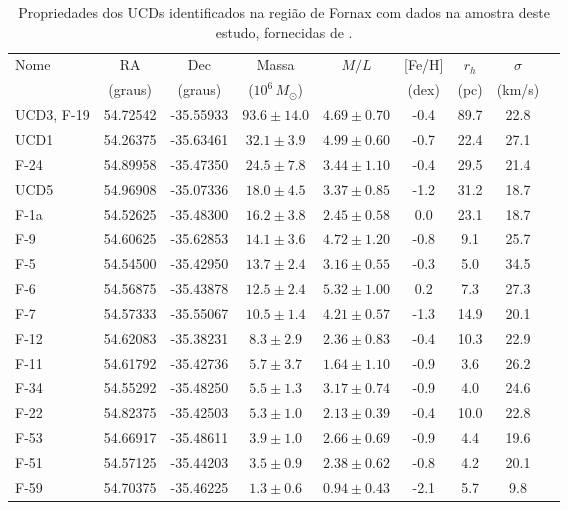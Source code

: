 \begin{table}[!ht]
    \centering
    \caption{Propriedades dos UCDs identificados na região de Fornax com dados na amostra deste estudo, fornecidas de \citealt{Mieske_2008_2}.}
    \begin{tabular}{lcccccccc}
        \toprule
        Nome & RA & Dec & Massa & $M/L$ & [Fe/H] & $r_h$ & $\sigma$ \\
        & (graus) & (graus) & ($10^6 \, M_\odot$) & & (dex) & (pc) & (km/s)\\
        \midrule
        UCD3, F-19 & 54.72542 & -35.55933 & $93.6 \pm 14.0$ & $4.69 \pm 0.70$ & -0.4 & 89.7 & 22.8 \\
        UCD1       & 54.26375 & -35.63461 & $32.1 \pm 3.9$  & $4.99 \pm 0.60$ & -0.7 & 22.4 & 27.1 \\
        F-24       & 54.89958 & -35.47350 & $24.5 \pm 7.8$  & $3.44 \pm 1.10$ & -0.4 & 29.5 & 21.4 \\
        UCD5       & 54.96908 & -35.07336 & $18.0 \pm 4.5$  & $3.37 \pm 0.85$ & -1.2 & 31.2 & 18.7 \\
        F-1a       & 54.52625 & -35.48300 & $16.2 \pm 3.8$  & $2.45 \pm 0.58$ & 0.0  & 23.1 & 18.7 \\
        F-9        & 54.60625 & -35.62853 & $14.1 \pm 3.6$  & $4.72 \pm 1.20$ & -0.8 & 9.1  & 25.7 \\
        F-5        & 54.54500 & -35.42950 & $13.7 \pm 2.4$  & $3.16 \pm 0.55$ & -0.3 & 5.0  & 34.5 \\
        F-6        & 54.56875 & -35.43878 & $12.5 \pm 2.4$  & $5.32 \pm 1.00$ & 0.2  & 7.3  & 27.3 \\
        F-7        & 54.57333 & -35.55067 & $10.5 \pm 1.4$  & $4.21 \pm 0.57$ & -1.3 & 14.9 & 20.1 \\
        F-12       & 54.62083 & -35.38231 & $8.3 \pm 2.9$   & $2.36 \pm 0.83$ & -0.4 & 10.3 & 22.9 \\
        F-11       & 54.61792 & -35.42736 & $5.7 \pm 3.7$   & $1.64 \pm 1.10$ & -0.9 & 3.6  & 26.2 \\
        F-34       & 54.55292 & -35.48250 & $5.5 \pm 1.3$   & $3.17 \pm 0.74$ & -0.9 & 4.0  & 24.6 \\
        F-22       & 54.82375 & -35.42503 & $5.3 \pm 1.0$   & $2.13 \pm 0.39$ & -0.4 & 10.0 & 22.8 \\
        F-53       & 54.66917 & -35.48611 & $3.9 \pm 1.0$   & $2.66 \pm 0.69$ & -0.9 & 4.4  & 19.6 \\
        F-51       & 54.57125 & -35.44203 & $3.5 \pm 0.9$   & $2.38 \pm 0.62$ & -0.8 & 4.2  & 20.1 \\
        F-59       & 54.70375 & -35.46225 & $1.3 \pm 0.6$   & $0.94 \pm 0.43$ & -2.1 & 5.7  & 9.8  \\
        \bottomrule
    \end{tabular}
    \label{ucds_fornax_propriedades}
\end{table}

